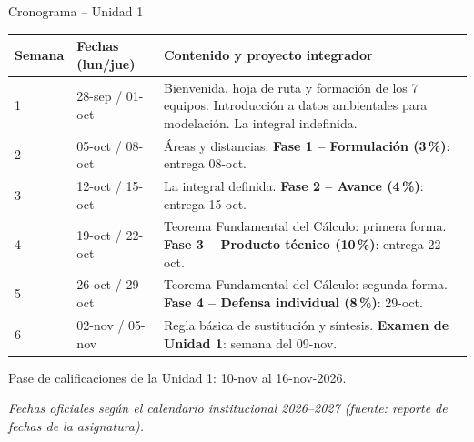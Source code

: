 \documentclass[aspectratio=169,11pt]{beamer}
\begin{document}
\begin{frame}{Cronograma -- Unidad 1}
\scriptsize
\renewcommand{\arraystretch}{1.15}
\begin{tabularx}{\textwidth}{C{1.6cm}L{2.6cm}Y}
\toprule
\textbf{Semana} & \textbf{Fechas (lun/jue)} & \textbf{Contenido y proyecto integrador} \\
 & 28-sep / 01-oct & Bienvenida, hoja de ruta y formación de los 7 equipos. Introducción a datos ambientales para modelación. La integral indefinida. \\
2 & 05-oct / 08-oct & Áreas y distancias. \textbf{Fase 1 -- Formulación (3\,\%)}: entrega 08-oct. \\
3 & 12-oct / 15-oct & La integral definida. \textbf{Fase 2 -- Avance (4\,\%)}: entrega 15-oct. \\
4 & 19-oct / 22-oct & Teorema Fundamental del Cálculo: primera forma. \textbf{Fase 3 -- Producto técnico (10\,\%)}: entrega 22-oct. \\
5 & 26-oct / 29-oct & Teorema Fundamental del Cálculo: segunda forma. \textbf{Fase 4 -- Defensa individual (8\,\%)}: 29-oct. \\
6 & 02-nov / 05-nov & Regla básica de sustitución y síntesis. \textbf{Examen de Unidad 1}: semana del 09-nov. \\
\bottomrule
\end{tabularx}
\vspace{0.15cm}
\begin{techbox}
Pase de calificaciones de la Unidad 1: 10-nov al 16-nov-2026.
\end{techbox}
\tiny\textit{Fechas oficiales según el calendario institucional 2026--2027 (fuente: reporte de fechas de la asignatura).}
\end{frame}
\end{document}
